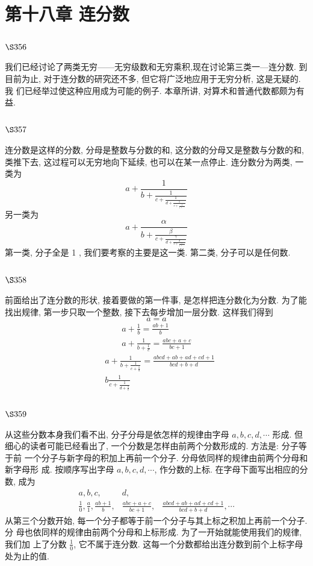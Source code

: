\chapter{第十八章 连分数}

\section{$\S 356$}

我们已经讨论了两类无穷——无穷级数和无穷乘积,现在讨论第三类一—连分数. 到目前为止, 对于连分数的研究还不多, 但它将广泛地应用于无穷分析, 这是无疑的. 我 们已经举过使这种应用成为可能的例子. 本章所讲, 对算术和普通代数都颇为有益.

\section{$\S 357$}

连分数是这样的分数, 分母是整数与分数的和, 这分数的分母又是整数与分数的和, 类推下去, 这过程可以无穷地向下延续, 也可以在某一点停止. 连分数分为两类, 一类为
\[
a+\frac{1}{b+\frac{1}{c+\frac{1}{d+\frac{1}{e+\frac{1}{f+\cdots}}}}}
\]
另一类为
\[
a+\frac{\alpha}{b+\frac{\beta}{c+\frac{\gamma}{d+\frac{\delta}{e+\frac{\varepsilon}{f+\cdots}}}}}
\]
第一类, 分子全是 1 , 我们要考察的主要是这一类. 第二类, 分子可以是任何数.

\section{$\S 358$}

前面给出了连分数的形状, 接着要做的第一件事, 是怎样把连分数化为分数. 为了能 找出规律, 第一步只取一个整数, 接下去每步增加一层分数. 这样我们得到
\[
a=a
\]
\[
\begin{aligned}
& \qquad a+\frac{1}{b}=\frac{a b+1}{b} \\
& \qquad a+\frac{1}{b+\frac{1}{c}}=\frac{a b c+a+c}{b c+1} \\
& a+\frac{1}{b+\frac{1}{c+\frac{1}{d}}}=\frac{a b c d+a b+a d+c d+1}{b c d+b+d} \\
& b \frac{1}{c+\frac{1}{d+\frac{1}{e}}}
\end{aligned}
\]
\section{$\S 359$}

从这些分数本身我们看不出, 分子分母是依怎样的规律由字母 $a, b, c, d, \cdots$ 形成. 但 细心的读者可能已经看出了, 一个分数是怎样由前两个分数形成的. 方法是: 分子等于前 一个分子与新字母的积加上再前一个分子. 分母依同样的规律由前两个分母和新字母形 成. 按顺序写出字母 $a, b, c, d, \cdots$, 作分数的上标. 在字母下面写出相应的分数, 成为
\[
\begin{array}{ccc}
a, b, c, & d, \\
\frac{1}{0}, \frac{a}{1}, \frac{a b+1}{b}, & \frac{a b c+a+c}{b c+1}, & \frac{a b c d+a b+a d+c d+1}{b c d+b+d}, \cdots
\end{array}
\]
从第三个分数开始, 每一个分子都等于前一个分子与其上标之积加上再前一个分子. 分 母也依同样的规律由前两个分母和上标形成. 为了一开始就能使用我们的规律, 我们加 上了分数 $\frac{1}{0}$, 它不属于连分数. 这每一个分数都给出连分数到前个上标字母处为止的值.


